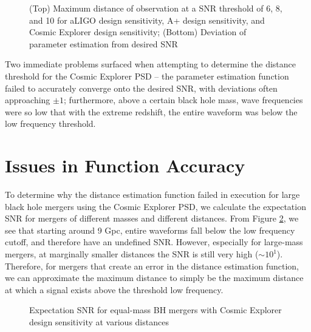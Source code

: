 \documentclass{article}
\begin{document}
\begin{figure}[!htb]
    \caption{\label{fig:multipledistance} (Top) Maximum distance of observation at a SNR threshold of 6, 8, and 10 for aLIGO design sensitivity, A+ design sensitivity, and Cosmic Explorer design sensitivity; (Bottom) Deviation of parameter estimation from desired SNR}
\end{figure}

Two immediate problems surfaced when attempting to determine the distance threshold for the Cosmic Explorer PSD -- the parameter estimation function failed to accurately converge onto the desired SNR, with deviations often approaching $\pm 1$; furthermore, above a certain black hole mass, wave frequencies were so low that with the extreme redshift, the entire waveform was below the low frequency threshold. 



\section{Issues in Function Accuracy}

To determine why the distance estimation function failed in execution for large black hole mergers using the Cosmic Explorer PSD, we calculate the expectation SNR for mergers of different masses and different distances. From Figure \ref{fig:maxdistance}, we see that starting around 9 Gpc, entire waveforms fall below the low frequency cutoff, and therefore have an undefined SNR. However, especially for large-mass mergers, at marginally smaller distances the SNR is still very high ($\sim 10^1$). Therefore, for mergers that create an error in the distance estimation function, we can approximate the maximum distance to simply be the maximum distance at which a signal exists above the threshold low frequency. \\  

\begin{figure}[!htb]
    \caption{\label{fig:maxdistance} Expectation SNR for equal-mass BH mergers with Cosmic Explorer design sensitivity at various distances}
\end{figure}
\end{document}
